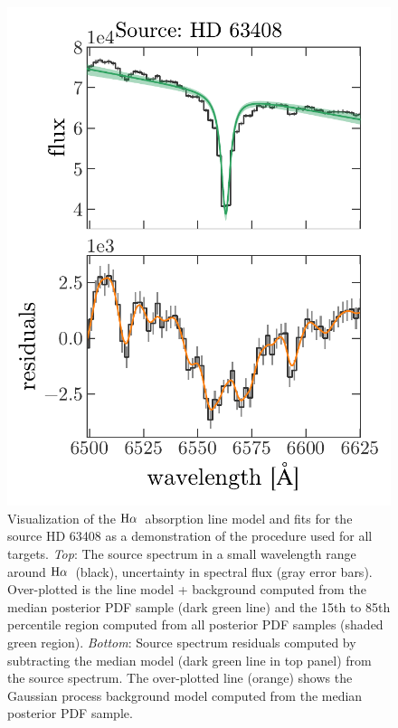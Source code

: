 \documentclass[modern, letterpaper]{aastex61}
\newcommand{\Ha}{\ensuremath{{\rm H}\alpha}}
\begin{document}
\begin{figure}[htbp]
  \begin{center}
    \includegraphics[width=\linewidth]{mcmc_example_fit.pdf}
  \end{center}
  \caption{%
    Visualization of the \Ha\ absorption line model and fits for the source HD
    63408 as a demonstration of the procedure used for all targets.
    \emph{Top}:
    The source spectrum in a small wavelength range around \Ha\ (black),
    uncertainty in spectral flux (gray error bars).
    Over-plotted is the line model + background computed from the median
    posterior PDF sample (dark green line) and the 15th to 85th percentile
    region computed from all posterior PDF samples (shaded green region).
    \emph{Bottom}:
    Source spectrum residuals computed by subtracting the median model (dark
    green line in top panel) from the source spectrum.
    The over-plotted line (orange) shows the Gaussian process background model
    computed from the median posterior PDF sample.
    \label{fig:Halpha-mcmc-fit}}
\end{figure}
\end{document}
